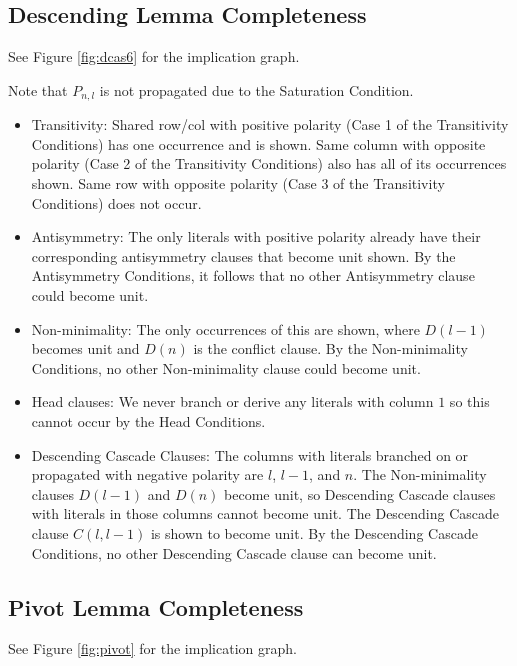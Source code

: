 \documentclass[10pt,a4paper]{article}
\begin{document}
\subsection{Descending Lemma Completeness}
See Figure \ref{fig:dcas6} for the implication graph.

Note that $P_{n, l}$ is not propagated due to the Saturation Condition. 
\begin{itemize}
    \item Transitivity: Shared row/col with positive polarity (Case 1 of the Transitivity Conditions) has one occurrence and is shown. Same column with opposite polarity (Case 2 of the Transitivity Conditions) also has all of its occurrences shown. Same row with opposite polarity (Case 3 of the Transitivity Conditions) does not occur. 
    \item Antisymmetry: The only literals with positive polarity already have their corresponding antisymmetry clauses that become unit shown. By the Antisymmetry Conditions, it follows that no other Antisymmetry clause could become unit. 
    \item Non-minimality: The only occurrences of this are shown, where $D(l - 1)$ becomes unit and $D(n)$ is the conflict clause. By the Non-minimality Conditions, no other Non-minimality clause could become unit. 
    \item Head clauses: We never branch or derive any literals with column $1$ so this cannot occur by the Head Conditions. 
    \item Descending Cascade Clauses: The columns with literals branched on or propagated with negative polarity are $l$, $l - 1$, and $n$. The Non-minimality clauses $D(l - 1)$ and $D(n)$ become unit, so Descending Cascade clauses with literals in those columns cannot become unit. The Descending Cascade clause $C(l, l - 1)$ is shown to become unit. By the Descending Cascade Conditions, no other Descending Cascade clause can become unit.
\end{itemize}

\subsection{Pivot Lemma Completeness}
See Figure \ref{fig:pivot} for the implication graph.
\end{document}

